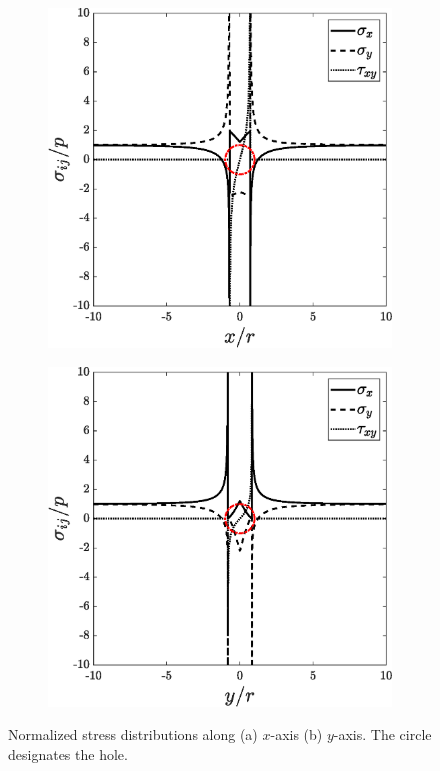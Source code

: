 \documentclass{article}
\begin{document}
\begin{figure}[ht]
        \begin{subfigure}{0.5\textwidth}
            \includegraphics[width=1\linewidth]{figures/stress_on_x.eps} 
            \caption{}
            \label{fig:stress_on_x}
        \end{subfigure}
        \begin{subfigure}{0.5\textwidth}
            \includegraphics[width=1\linewidth]{figures/stress_on_y.eps} 
            \caption{}
            \label{fig:stress_on_y}
        \end{subfigure}
    \caption{Normalized stress distributions along (a) $x$-axis (b) $y$-axis. The circle designates the hole.}
\end{figure}
\end{document}
